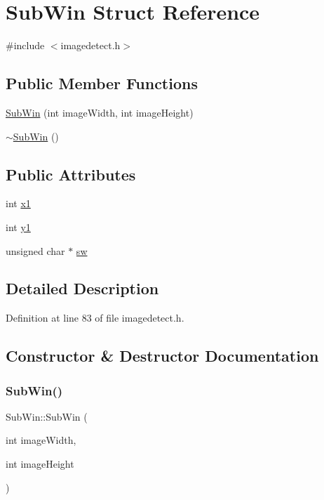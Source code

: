 \hypertarget{struct_sub_win}{}\section{Sub\+Win Struct Reference}
\label{struct_sub_win}


{\ttfamily \#include $<$imagedetect.\+h$>$}

\subsection*{Public Member Functions}
\begin{DoxyCompactItemize}
\item 
\mbox{\hyperlink{struct_sub_win_a21a3d0ba6ebe18fb3d4a98981099d3ce}{Sub\+Win}} (int image\+Width, int image\+Height)
\item 
\mbox{\hyperlink{struct_sub_win_a0109060baef32fe3bce2d5d7a0bb14ad}{$\sim$\+Sub\+Win}} ()
\end{DoxyCompactItemize}
\subsection*{Public Attributes}
\begin{DoxyCompactItemize}
\item 
int \mbox{\hyperlink{struct_sub_win_a9d3d7d63aafe49c4387ffff1654c842d}{x1}}
\item 
int \mbox{\hyperlink{struct_sub_win_a46ae68245f168b20f7a0c1c16ad6902a}{y1}}
\item 
unsigned char $\ast$ \mbox{\hyperlink{struct_sub_win_afc0729b8c7adcf1084b336fc9c06d17a}{sw}}
\end{DoxyCompactItemize}


\subsection{Detailed Description}


Definition at line 83 of file imagedetect.\+h.



\subsection{Constructor \& Destructor Documentation}
\mbox{\label{struct_sub_win_a21a3d0ba6ebe18fb3d4a98981099d3ce}} 
\subsubsection{\texorpdfstring{SubWin()}{SubWin()}}
{\footnotesize\ttfamily Sub\+Win\+::\+Sub\+Win (\begin{DoxyParamCaption}\item[{int}]{image\+Width,  }\item[{int}]{image\+Height }\end{DoxyParamCaption})\hspace{0.3cm}{\ttfamily [inline]}}



